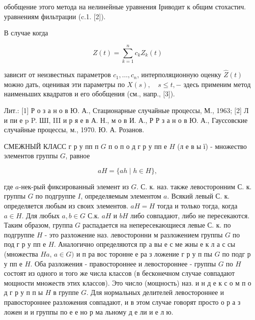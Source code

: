 \documentclass[10pt]{article}
\begin{document}
обобщение этого метода на нелинейные уравнения Іриводит к общим стохастич. уравнениям фильтрации (c.1. [2]).



В случае когда



\[

Z(t)=\sum_{k=1}^{n} c_{k} Z_{k}(t)

\]



зависит от неизвестных параметров $c_{1}, \ldots, c_{n}$, интерполяционную оценку $\hat{Z}(t)$ можно дать, оценивая эти параметры по $X(s), \quad s \leqslant t,-$ здесь применим метод наименьших квадратов и его обобщения (см., напр., [3]).



Лит.: [1] Р о з а н о в Ю. А., Стационарные случайные процессы, М., 1963; [2] Л и пи е p P. ШI, III и р я е в А. Н., м о в И. А., Р Р з а н о в Ю. А., Гауссовские случайные процессы, м., 1970. Ю. А. Розанов.



СМЕЖНЫЙ КЛАСС г р у пп п $G$ п о п о д г р у пп е $H$ (л е в ы ї) - множество элементов группы $G$, равное



\[

a H=\{a h \mid h \in H\},

\]



где $a$-нек-рый фиксированный элемент из $G$. С. к. наз. также левосторонним С. к. группы $G$ по подгруппе $I$, определяемым элементом $a$. Всякий левый С. к. определяется любым из своих элементов. $a H=H$ тогда и только тогда, когда $a \in H$. Для любых $a, b \in G$ С.к. $a H$ и $b H$ либо совпадают, либо не пересекаются. Таким образом, группа $G$ распадается на непересекающиеся левые С. к. по подгруппе $H$ - это разложение наз. левосторонни м разложением группы $G$ по под г р у пп е $H$. Аналогично определяются пр а вы е с ме жны е к л а с сы (множества $H a$, $a \in G)$ и п ра вос торонне е ра з ложение г р у п пы $G$ по подг р у пп е $H$. Оба разложения - правостороннее и левостороннее - группы $G$ по $H$ состоят из одного и того же числа классов (в бесконечном случае совпадают мощности множеств этих классов). Это число (мощность) наз. и н д е к с о м п о д г р у п п ы $H$ в группе $G$. Для нормальных делителей левостороннее и правостороннее разложения совпадают, и в этом случае говорят просто о р а з ложен и и группы по е е но р ма льному д е ли и е л ю.
\end{document}
